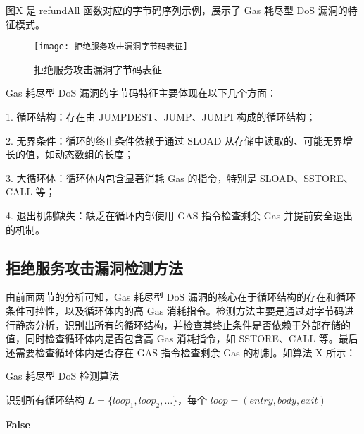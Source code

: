 \documentclass[print, master, vlined, timesmath]{DissertUESTC}
\begin{document}
图X 是 refundAll 函数对应的字节码序列示例，展示了 Gas 耗尽型 DoS 漏洞的特征模式。

\begin{figure}[htbp]
    \centering
    \texttt{[image: 拒绝服务攻击漏洞字节码表征]}
    \caption{拒绝服务攻击漏洞字节码表征}
    \label{fig:拒绝服务攻击漏洞字节码表征}
\end{figure}    

Gas 耗尽型 DoS 漏洞的字节码特征主要体现在以下几个方面：

1. 循环结构：存在由 JUMPDEST、JUMP、JUMPI 构成的循环结构；

2. 无界条件：循环的终止条件依赖于通过 SLOAD 从存储中读取的、可能无界增长的值，如动态数组的长度；

3. 大循环体：循环体内包含显著消耗 Gas 的指令，特别是 SLOAD、SSTORE、 CALL 等；

4. 退出机制缺失：缺乏在循环内部使用 GAS 指令检查剩余 Gas 并提前安全退出的机制。


\subsection{拒绝服务攻击漏洞检测方法}

由前面两节的分析可知，Gas 耗尽型 DoS 漏洞的核心在于循环结构的存在和循环条件可控性，以及循环体内的高 Gas 消耗指令。检测方法主要是通过对字节码进行静态分析，识别出所有的循环结构，并检查其终止条件是否依赖于外部存储的值，同时检查循环体内是否包含高 Gas 消耗指令，如 SSTORE、CALL 等。最后还需要检查循环体内是否存在 GAS 指令检查剩余 Gas 的机制。如算法 X 所示：


\begin{algorithm}[H]
    \caption{Gas 耗尽型 DoS 检测算法}
    
    识别所有循环结构 $L = \{loop_1, loop_2, \dots\}$，每个 $loop = (entry, body, exit)$\;
    
    
    \Return \textbf{False}
    \end{algorithm}
    
\end{document}
